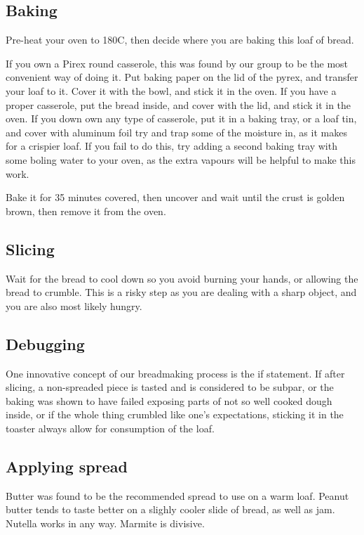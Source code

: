 \documentclass[acmtog, nonacm]{acmart}
\begin{document}
\subsection{Baking}
Pre-heat your oven to 180\textdegree C, then decide where you are baking this loaf of bread.

If you own a Pirex round casserole, this was found by our group to be the most convenient way of doing it. 
Put baking paper on the lid of the pyrex, and transfer your loaf to it. 
Cover it with the bowl, and stick it in the oven. 
If you have a proper casserole, put the bread inside, and cover with the lid, and stick it in the oven. 
If you down own any type of casserole, put it in a baking tray, or a loaf tin, and cover with aluminum foil try and trap some of the moisture in, as it makes for a crispier loaf. 
If you fail to do this, try adding a second baking tray with some boling water to your oven, as the extra vapours will be helpful to make this work. 

Bake it for 35 minutes covered, then uncover and wait until the crust is golden brown, then remove it from the oven.

\subsection{Slicing}
Wait for the bread to cool down so you avoid burning your hands, or allowing the bread to crumble. 
This is a risky step as you are dealing with a sharp object, and you are also most likely hungry. 

\subsection{Debugging}
One innovative concept of our breadmaking process is the if statement.
If after slicing, a non-spreaded piece is tasted and is considered to be subpar, or the baking was shown to have failed exposing parts of not so well cooked dough inside, or if the whole thing crumbled like one's expectations, sticking it in the toaster always allow for consumption of the loaf. 

\subsection{Applying spread}
Butter was found to be the recommended spread to use on a warm loaf. 
Peanut butter tends to taste better on a slighly cooler slide of bread, as well as jam. 
Nutella works in any way.
Marmite is divisive. 
\end{document}
